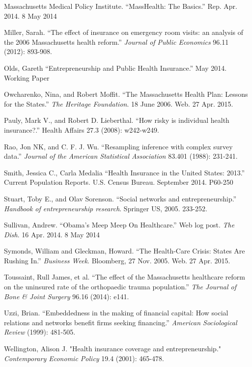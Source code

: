 \begin{singlespace}
\begin{thebibliography}{99}
Massachusetts Medical Policy Institute. ``MassHealth: The Basics.'' Rep. Apr. 2014. 8 May 2014 

Miller, Sarah. ``The effect of insurance on emergency room visits: an analysis of the 2006 Massachusetts health reform.'' \emph{Journal of Public Economics} 96.11 (2012): 893-908.

Olds, Gareth ``Entrepreneurship and Public Health Insurance.'' May 2014. Working Paper

Owcharenko, Nina, and Robert Moffit. ``The Massachusetts Health Plan: Lessons for the States.'' \emph{The Heritage Foundation}. 18 June 2006. Web. 27 Apr. 2015.

Pauly, Mark V., and Robert D. Lieberthal. ``How risky is individual health insurance?.'' Health Affairs 27.3 (2008): w242-w249.

Rao, Jon NK, and C. F. J. Wu. ``Resampling inference with complex survey data.'' \emph{Journal of the American Statistical Association} 83.401 (1988): 231-241.

Smith, Jessica C., Carla Medalia ``Health Insurance in the United States: 2013.'' Current Population Reports. U.S. Census Bureau. September 2014. P60-250

Stuart, Toby E., and Olav Sorenson. ``Social networks and entrepreneurship.'' \emph{Handbook of entrepreneurship research}. Springer US, 2005. 233-252.

Sullivan, Andrew. ``Obama's Meep Meep On Healthcare.'' Web log post. \emph{The Dish}. 16 Apr. 2014. 8 May 2014 

Symonds, William and Gleckman, Howard.  ``The Health-Care Crisis: States Are Rushing In.'' \emph{Business Week}. Bloomberg, 27 Nov. 2005. Web. 27 Apr. 2015.

Toussaint, Rull James, et al. ``The effect of the Massachusetts healthcare reform on the uninsured rate of the orthopaedic trauma population.'' \emph{ The Journal of Bone \& Joint Surgery} 96.16 (2014): e141.

Uzzi, Brian. ``Embeddedness in the making of financial capital: How social relations and networks benefit firms seeking financing.'' \emph{American Sociological Review} (1999): 481-505.

Wellington, Alison J. "Health insurance coverage and entrepreneurship." \emph{Contemporary Economic Policy} 19.4 (2001): 465-478.

\end{thebibliography}

\end{singlespace}
